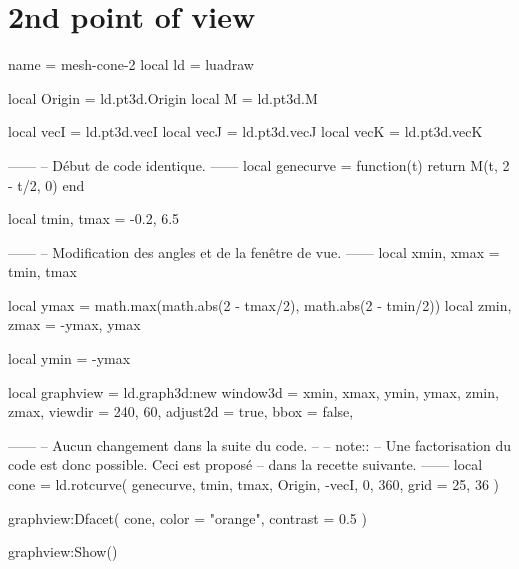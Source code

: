 \documentclass[varwidth, border = 3pt]{standalone}
\begin{document}
\section*{2nd point of view}

\begin{luadraw*}{name = mesh-cone-2}
local ld = luadraw

local Origin = ld.pt3d.Origin
local M      = ld.pt3d.M

local vecI = ld.pt3d.vecI
local vecJ = ld.pt3d.vecJ
local vecK = ld.pt3d.vecK

------
-- Début de code identique.
------
local genecurve = function(t)
  return M(t, 2 - t/2, 0)
end

local tmin, tmax = -0.2, 6.5

------
-- Modification des angles et de la fenêtre de vue.
------
local xmin, xmax = tmin, tmax

local ymax = math.max(math.abs(2 - tmax/2), math.abs(2 - tmin/2))
local zmin, zmax = -ymax, ymax

local ymin = -ymax

local graphview = ld.graph3d:new{
  window3d = {xmin, xmax, ymin, ymax, zmin, zmax},
  viewdir  = {240, 60},
  adjust2d = true,
  bbox     = false,
}

------
-- Aucun changement dans la suite du code.
--
-- note::
--     Une factorisation du code est donc possible. Ceci est proposé
--     dans la recette suivante.
------
local cone = ld.rotcurve(
  genecurve, tmin, tmax,
  {Origin, -vecI},
  0, 360,
  {
    grid = {25, 36}
  }
)

graphview:Dfacet(
  cone,
  {
    color  = "orange",
    contrast = 0.5
  }
)

graphview:Show()
\end{luadraw*}
\end{document}
